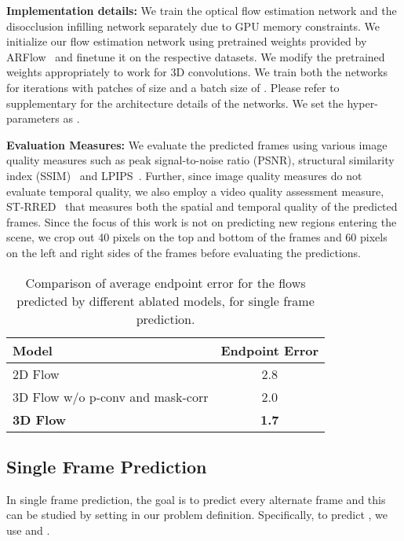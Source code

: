 \documentclass[preprint]{vgtc}
\begin{document}
    \textbf{Implementation details:}
    We train the optical flow estimation network  and the disocclusion infilling network separately due to GPU memory constraints.
    We initialize our flow estimation network using pretrained weights provided by ARFlow~\cite{liu2020arflow} and finetune it on the respective datasets.
    We modify the pretrained weights appropriately to work for 3D convolutions.
    We train both the networks for  iterations with patches of size  and a batch size of .
Please refer to supplementary for the architecture details of the networks.
    We set the hyper-parameters as .



    \textbf{Evaluation Measures:}
    We evaluate the predicted frames using various image quality measures such as peak signal-to-noise ratio (PSNR), structural similarity index (SSIM)~\cite{wang2004image} and LPIPS~\cite{zhang2018unreasonable}.
    Further, since image quality measures do not evaluate temporal quality, we also employ a video quality assessment measure, ST-RRED~\cite{soundararajan2013video} that measures both the spatial and temporal quality of the predicted frames.
    Since the focus of this work is not on predicting new regions entering the scene, we crop out 40 pixels on the top and bottom of the frames and 60 pixels on the left and right sides of the frames before evaluating the predictions.
    \begin{table}
        \centering
\caption{Comparison of average endpoint error for the flows predicted by different ablated models, for single frame prediction.}
        \begin{tabular}{l|c}
            \hline
            \textbf{Model} & \textbf{Endpoint Error} \\
            \hline
            2D Flow & 2.8 \\
            3D Flow w/o p-conv and mask-corr & 2.0 \\
            \textbf{3D Flow} & \textbf{1.7} \\
            \hline
        \end{tabular}
        \label{tab:ablations}
    \end{table}

    \subsection{Single Frame Prediction}\label{subsec:single-frame-prediction}
    In single frame prediction, the goal is to predict every alternate frame and this can be studied by setting  in our problem definition.
    Specifically, to predict , we use  and .
\end{document}
